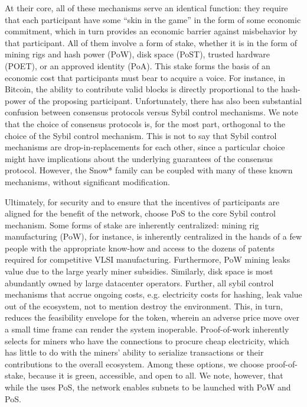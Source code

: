 \documentclass[runningheads]{llncs}
\begin{document}
At their core, all of these mechanisms serve an identical function: they require that each participant have some ``skin in the game'' in the form of some economic commitment, which in turn provides an economic barrier against misbehavior by that participant. 
All of them involve a form of stake, whether it is in the form of mining rigs and hash power (PoW), disk space (PoST), trusted hardware (POET), or an approved identity (PoA). 
This stake forms the basis of an economic cost that participants must bear to acquire a voice. 
For instance, in Bitcoin, the ability to contribute valid blocks is directly proportional to the hash-power of the proposing participant.
Unfortunately, there has also been substantial confusion between consensus protocols versus Sybil control mechanisms.
We note that the choice of consensus protocols is, for the most part, orthogonal to the choice of the Sybil control mechanism. 
This is not to say that Sybil control mechanisms are drop-in-replacements for each other, since a particular choice might have implications about the underlying guarantees of the consensus protocol. 
However, the Snow* family can be coupled with many of these known mechanisms, without significant modification. 

Ultimately, for security and to ensure that the incentives of participants are aligned for the benefit of the network, \AVATokenName{} choose PoS to the core Sybil control mechanism. 
Some forms of stake are inherently centralized: mining rig manufacturing (PoW), for instance, is inherently centralized in the hands of a few people with the appropriate know-how and access to the dozens of patents required for competitive VLSI manufacturing.
Furthermore, PoW mining leaks value due to the large yearly miner subsidies. 
Similarly, disk space is most abundantly owned by large datacenter operators.%
Further, all sybil control mechanisms that accrue ongoing costs, e.g. electricity costs for hashing, leak value out of the ecosystem, not to mention destroy the environment. This, in turn, reduces the feasibility envelope for the token, wherein an adverse price move over a small time frame can render the system inoperable.
Proof-of-work inherently selects for miners who have the connections to procure cheap electricity, which has little to do with the miners' ability to serialize transactions or their contributions to the overall ecosystem.
Among these options, we choose proof-of-stake, because it is green, accessible, and open to all. 
We note, however, that while the \AVATokenName{} uses PoS, the \AVAPlatformName{} network enables subnets to be launched with PoW and PoS.
\end{document}
